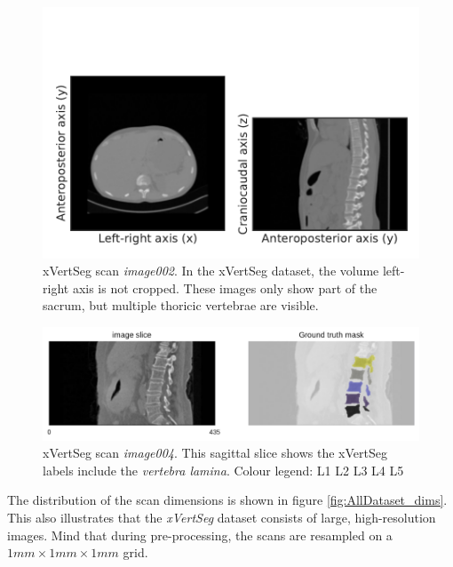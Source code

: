 \begin{figure}
    \centering
    \includegraphics[width=.95\textwidth]{automated_graphs/xVertSeg_image002.pdf}
    \caption{xVertSeg scan \textit{image002}. In the xVertSeg dataset, the volume left-right axis is not cropped. 
    These images only show part of the sacrum, but multiple thoricic vertebrae are visible.\label{fig:xVertSeg_image002}}
\end{figure}
\begin{figure}
    \centering
    \includegraphics[width=.95\textwidth]{images/xVertSeg004_s210_mask.pdf}
    \caption{\label{fig:xVertSeg004_s210_mask} xVertSeg scan \textit{image004}. This sagittal slice shows the xVertSeg labels include the \textit{vertebra lamina}.
    \newline\noindent Colour legend: \newline
\noindent{}  L1 %
\hspace{2mm}  L2 %
\hspace{2mm}  L3 %
\hspace{2mm}  L4 %
\hspace{2mm}  L5
    }
\end{figure}

The distribution of the scan dimensions is shown in figure \ref{fig:AllDataset_dims}. This also illustrates that the \textit{xVertSeg} dataset consists of large, high-resolution images.
Mind that during pre-processing, the scans are resampled on a $1mm \times 1mm \times 1mm$ grid.